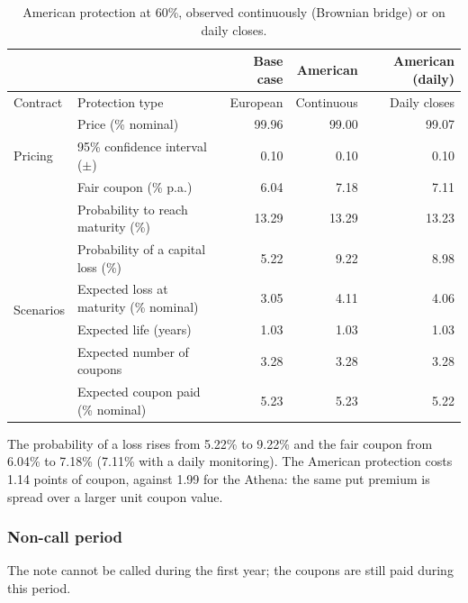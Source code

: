 \documentclass[11pt,a4paper]{article}
\begin{document}
\begin{table}[htbp]
  \centering
  \small
  \begin{tabular}{llrrr}
    \toprule
     & & \textbf{Base case} & \textbf{American} & \textbf{American (daily)} \\
    \midrule
    \multirow{1}{*}{Contract}
      & Protection type & European & Continuous & Daily closes \\
    \midrule
    \multirow{3}{*}{Pricing}
      & Price (\% nominal) & 99.96 & 99.00 & 99.07 \\
      & 95\% confidence interval ($\pm$) & 0.10 & 0.10 & 0.10 \\
      & Fair coupon (\% p.a.) & 6.04 & 7.18 & 7.11 \\
    \midrule
    \multirow{6}{*}{Scenarios}
      & Probability to reach maturity (\%) & 13.29 & 13.29 & 13.23 \\
      & Probability of a capital loss (\%) & 5.22 & 9.22 & 8.98 \\
      & Expected loss at maturity (\% nominal) & 3.05 & 4.11 & 4.06 \\
      & Expected life (years) & 1.03 & 1.03 & 1.03 \\
      & Expected number of coupons & 3.28 & 3.28 & 3.28 \\
      & Expected coupon paid (\% nominal) & 5.23 & 5.23 & 5.22 \\
    \bottomrule
  \end{tabular}
  \caption{American protection at 60\%, observed continuously (Brownian bridge) or on daily closes.}
  \label{tab:phoenix-american}
\end{table}

The probability of a loss rises from 5.22\% to 9.22\% and the fair coupon from 6.04\% to 7.18\% (7.11\% with a daily
monitoring). The American protection costs 1.14 points of coupon, against 1.99 for the Athena: the same put premium is
spread over a larger unit coupon value.

\clearpage
\subsubsection{Non-call period}

The note cannot be called during the first year; the coupons are still paid during this period.
\end{document}
